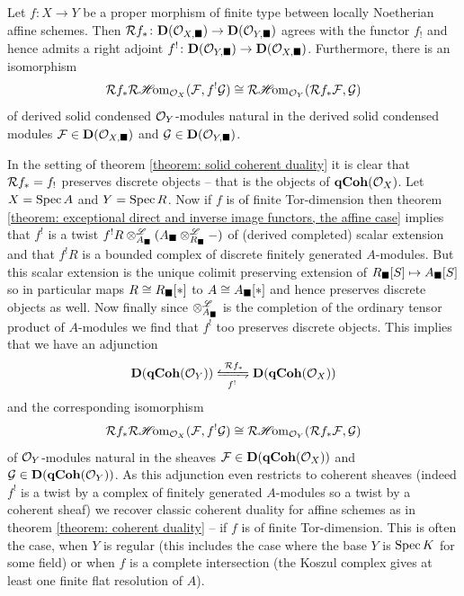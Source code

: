\begin{theorem}
	\label{theorem: solid coherent duality}
	
	Let $f\colon X\to Y$ be a proper morphism of finite type between locally Noetherian affine schemes. Then $\mathcal{R} f_\ast\colon {{\mathbf{D}}({{\mathcal{O}}_{X,\blacksquare}})} \to {{\mathbf{D}}({{\mathcal{O}}_{Y,\blacksquare}})}$ agrees with the functor $f_!$ and hence admits a right adjoint $f^!\colon {{\mathbf{D}}({{\mathcal{O}}_{Y, \blacksquare}})}\to {{\mathbf{D}}({{\mathcal{O}}_{X,\blacksquare}})}$. Furthermore, there is an isomorphism
		$$\mathcal{R} f_\ast \mathcal{R}{\operatorname{\mathscr{H}\!om}}_{{\mathcal{O}}_{X}}({\mathcal{F}}, f^!{\mathcal{G}}) \cong \mathcal{R}{\operatorname{\mathscr{H}\!om}}_{{{\mathcal{O}}_{Y}}}(\mathcal{R} f_\ast {\mathcal{F}}, {\mathcal{G}})$$
	of derived solid condensed ${{\mathcal{O}}_{Y}}$-modules natural in the derived solid condensed modules ${\mathcal{F}}\in{{\mathbf{D}}({{\mathcal{O}}_{X,\blacksquare}})}$ and ${\mathcal{G}}\in{{\mathbf{D}}({{\mathcal{O}}_{Y,\blacksquare}})}$.
\end{theorem}

\begin{remark}
	In the setting of theorem \ref{theorem: solid coherent duality} it is clear that $\mathcal{R} f_\ast = f_!$ preserves discrete objects -- that is the objects of ${{\mathbf{qCoh}}({{\mathcal{O}}_{X}})}$. Let $X=\operatorname{Spec} A$ and $Y=\operatorname{Spec} R$. Now if $f$ is of finite Tor-dimension then theorem \ref{theorem: exceptional direct and inverse image functors, the affine case} implies that $f^!$ is a twist $f^!R \otimes^{\mathscr{L}}_{A_\blacksquare}(A_\blacksquare\otimes^{\mathscr{L}}_{R_\blacksquare} -)$ of (derived completed) scalar extension and that $f^!R$ is a bounded complex of discrete finitely generated $A$-modules. But this scalar extension is the unique colimit preserving extension of ${R_\blacksquare[S]}\mapsto {A_\blacksquare[S]}$ so in particular maps $R\cong{R_\blacksquare[\ast]}$ to $A\cong {A_\blacksquare[\ast]}$ and hence preserves discrete objects as well. Now finally since $\otimes^{\mathscr{L}}_{A_\blacksquare}$ is the completion of the ordinary tensor product of $A$-modules we find that $f^!$ too preserves discrete objects. This implies that we have an adjunction
		$$\derived{\qCoh{Y}}\xleftrightarrows{\RightD f_\ast}{f^!}\derived{\qCoh{X}}$$
	and the corresponding isomorphism
		$$\mathcal{R} f_\ast \mathcal{R}{\operatorname{\mathscr{H}\!om}}_{{\mathcal{O}}_{X}}({\mathcal{F}}, f^!{\mathcal{G}}) \cong \mathcal{R}{\operatorname{\mathscr{H}\!om}}_{{{\mathcal{O}}_{Y}}}(\mathcal{R} f_\ast {\mathcal{F}}, {\mathcal{G}})$$
	of ${{\mathcal{O}}_{Y}}$-modules natural in the sheaves ${\mathcal{F}}\in{{\mathbf{D}}({{\mathbf{qCoh}}({{\mathcal{O}}_{X}})})}$ and ${\mathcal{G}}\in{{\mathbf{D}}({{\mathbf{qCoh}}({{\mathcal{O}}_{Y}})})}$. As this adjunction even restricts to coherent sheaves (indeed $f^!$ is a twist by a complex of finitely generated $A$-modules so a twist by a coherent sheaf) we recover classic coherent duality for affine schemes as in theorem \ref{theorem: coherent duality} -- if $f$ is of finite Tor-dimension. This is often the case, \eg when $Y$ is regular (this includes the case where the base $Y$ is $\operatorname{Spec} K$ for some field) or when $f$ is a complete intersection (the Koszul complex gives at least one finite flat resolution of $A$).
\end{remark}
